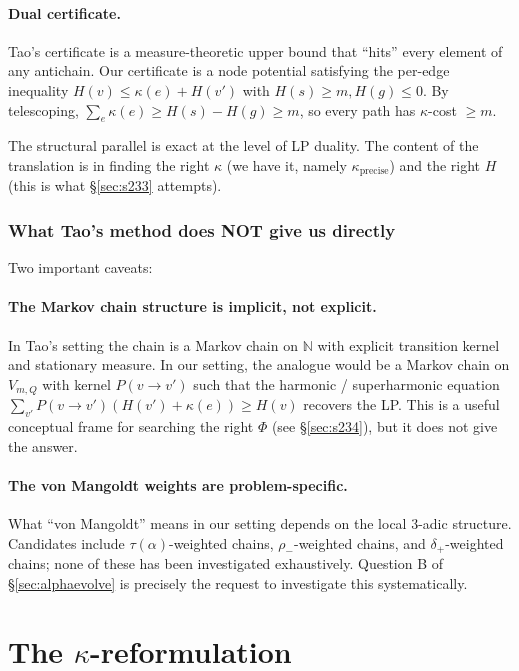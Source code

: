 \documentclass[11pt,a4paper]{article}
\theoremstyle{plain}
\theoremstyle{definition}
\newcommand{\NN}{\mathbb{N}}
\begin{document}
\paragraph{Dual certificate.}
Tao's certificate is a measure-theoretic upper bound that
``hits'' every element of any antichain. Our certificate is a node
potential satisfying the per-edge inequality
$H(v) \le \kappa(e) + H(v')$ with $H(s) \ge m, H(g) \le 0$. By
telescoping, $\sum_e \kappa(e) \ge H(s) - H(g) \ge m$, so every
path has $\kappa$-cost $\ge m$.

The structural parallel is exact at the level of LP duality. The
content of the translation is in finding the right $\kappa$ (we
have it, namely $\kappa_{\mathrm{precise}}$) and the right $H$
(this is what \S\ref{sec:s233} attempts).

\subsubsection*{What Tao's method does NOT give us directly}

Two important caveats:

\paragraph{The Markov chain structure is implicit, not explicit.}
In Tao's setting the chain is a Markov chain on $\NN$ with explicit
transition kernel and stationary measure. In our setting, the
analogue would be a Markov chain on $V_{m, Q}$ with kernel
$P(v \to v')$ such that the harmonic / superharmonic equation
$\sum_{v'} P(v \to v') (H(v') + \kappa(e)) \ge H(v)$ recovers the
LP. This is a useful conceptual frame for searching the right
$\Phi$ (see \S\ref{sec:s234}), but it does not give the answer.

\paragraph{The von Mangoldt weights are
problem-specific.}
What ``von Mangoldt'' means in our setting depends on the local
3-adic structure. Candidates include
$\tau(\alpha)$-weighted chains,
$\rho_-$-weighted chains, and
$\delta_+$-weighted chains; none of these has been investigated
exhaustively. Question B of \S\ref{sec:alphaevolve} is precisely
the request to investigate this systematically.

\section{The $\kappa$-reformulation}\label{sec:s230-kappa}
\end{document}
